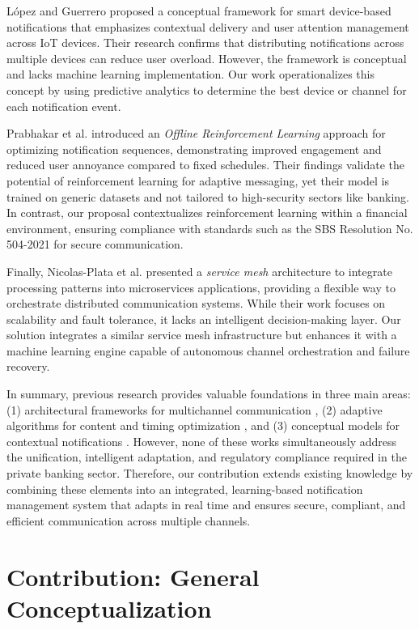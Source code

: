 \documentclass[conference]{IEEEtran}
\begin{document}
López and Guerrero \cite{lopez2020} proposed a conceptual framework for smart device-based notifications that emphasizes contextual delivery and user attention management across IoT devices. Their research confirms that distributing notifications across multiple devices can reduce user overload. However, the framework is conceptual and lacks machine learning implementation. Our work operationalizes this concept by using predictive analytics to determine the best device or channel for each notification event.

Prabhakar et al. \cite{prabhakar2022} introduced an \textit{Offline Reinforcement Learning} approach for optimizing notification sequences, demonstrating improved engagement and reduced user annoyance compared to fixed schedules. Their findings validate the potential of reinforcement learning for adaptive messaging, yet their model is trained on generic datasets and not tailored to high-security sectors like banking. In contrast, our proposal contextualizes reinforcement learning within a financial environment, ensuring compliance with standards such as the SBS Resolution No. 504-2021 for secure communication.

Finally, Nicolas-Plata et al. \cite{nicolas2024} presented a \textit{service mesh} architecture to integrate processing patterns into microservices applications, providing a flexible way to orchestrate distributed communication systems. While their work focuses on scalability and fault tolerance, it lacks an intelligent decision-making layer. Our solution integrates a similar service mesh infrastructure but enhances it with a machine learning engine capable of autonomous channel orchestration and failure recovery.

In summary, previous research provides valuable foundations in three main areas: (1) architectural frameworks for multichannel communication \cite{salami2022, nicolas2024}, (2) adaptive algorithms for content and timing optimization \cite{yancey2020, prabhakar2022}, and (3) conceptual models for contextual notifications \cite{lopez2020}. However, none of these works simultaneously address the unification, intelligent adaptation, and regulatory compliance required in the private banking sector. Therefore, our contribution extends existing knowledge by combining these elements into an integrated, learning-based notification management system that adapts in real time and ensures secure, compliant, and efficient communication across multiple channels.

\section{Contribution: General Conceptualization}
\end{document}
